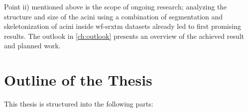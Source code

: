 Point ii) mentioned above is the scope of ongoing research; analyzing the structure and size of the acini using a combination of segmentation and skeletonization of acini inside \ac{wf-srxtm} datasets already led to first promising results. The outlook in \autoref{ch:outlook} presents an overview of the achieved result and planned work.

\section{Outline of the Thesis}
This thesis is structured into the following parts:
